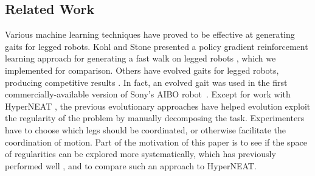 \subsection{Related Work}

Various machine learning techniques have proved to be effective at
generating gaits for legged robots. Kohl and Stone presented a policy
gradient reinforcement learning approach for generating a fast walk on
legged robots \citep{kohl}, which we implemented for comparison. Others
have evolved gaits for legged robots, producing competitive
results \citep{chernova2005evolutionary, hornby2005autonomous, zykov,
  clune2009evolving, clune2011performance, clune2009hybrid,
  clune2009sensitivity, tellez2006evolving, valsalam2008modular}. In
fact, an evolved gait was used in the first commercially-available
version of Sony's AIBO robot~\citep{hornby2005autonomous}. Except for
work with HyperNEAT \citep{clune2009evolving, clune2011performance,
  clune2009hybrid, clune2009sensitivity}, the previous evolutionary
approaches have helped evolution exploit the regularity of the problem
by manually decomposing the task. Experimenters have
to choose which legs should be coordinated, or otherwise facilitate
the coordination of motion. Part of the motivation of this paper
is to see if the space of regularities can be explored more systematically,
which has previously performed well \citep{valsalam2008modular}, and to
compare such an approach to HyperNEAT.


